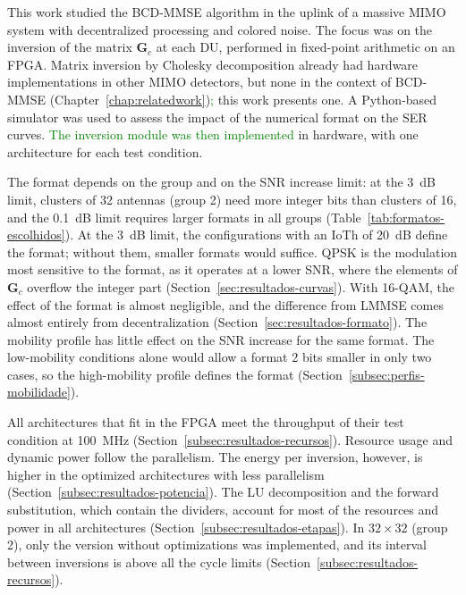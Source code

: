 This work studied the BCD-MMSE algorithm in the uplink of a massive MIMO system with decentralized processing and colored noise. The focus was on the inversion of the matrix $\mathbf G_c$ at each DU, performed in fixed-point arithmetic on an FPGA. Matrix inversion by Cholesky decomposition already had hardware implementations in other MIMO detectors, but none in the context of BCD-MMSE (Chapter~\ref{chap:relatedwork})\textcolor{GREEN}{;} this work presents one. A Python-based simulator was used to assess the impact of the numerical format on the SER curves. \textcolor{GREEN}{The inversion module was then implemented} in hardware, with one architecture for each test condition.

The format depends on the group and on the SNR increase limit: at the 3~dB limit, clusters of 32 antennas (group 2) need more integer bits than clusters of 16, and the 0.1~dB limit requires larger formats in all groups (Table~\ref{tab:formatos-escolhidos}). At the 3~dB limit, the configurations with an IoTh of 20~dB define the format; without them, smaller formats would suffice. QPSK is the modulation most sensitive to the format, as it operates at a lower SNR, where the elements of $\mathbf G_c$ overflow the integer part (Section~\ref{sec:resultados-curvas}). With 16-QAM, the effect of the format is almost negligible, and the difference from LMMSE comes almost entirely from decentralization (Section~\ref{sec:resultados-formato}). The mobility profile has little effect on the SNR increase for the same format. The low-mobility conditions alone would allow a format 2 bits smaller in only two cases, so the high-mobility profile defines the format (Section~\ref{subsec:perfis-mobilidade}).

All architectures that fit in the FPGA meet the throughput of their test condition at 100~MHz (Section~\ref{subsec:resultados-recursos}). Resource usage and dynamic power follow the parallelism. The energy per inversion, however, is higher in the optimized architectures with less parallelism (Section~\ref{subsec:resultados-potencia}). The LU decomposition and the forward substitution, which contain the dividers, account for most of the resources and power in all architectures (Section~\ref{subsec:resultados-etapas}). In $32 \times 32$ (group 2), only the version without optimizations was implemented, and its interval between inversions is above all the cycle limits (Section~\ref{subsec:resultados-recursos}).

